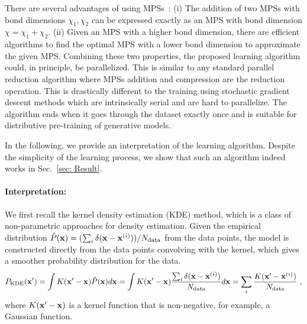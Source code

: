 \documentclass[nonatbib]{article}
\newcommand{\citep}{\cite}
\begin{document}
There are several advantages of using MPSs~\citep{schollwock2011density}:
(i) The addition of two MPSs with bond dimensions $\chi_1, \chi_2$ can be expressed exactly as an MPS with bond dimension $\chi= \chi_1 + \chi_2 $.
(ii) Given an MPS with a higher bond dimension, there are efficient algorithms to find the optimal MPS with a lower bond dimension to approximate the given MPS.
Combining these two properties, the proposed learning algorithm could, in principle, be parallelized.
This is similar to any standard parallel reduction algorithm where MPSs addition and compression are the reduction operation.
This is drastically different to the training using stochastic gradient descent methods which are intrinsically serial and are hard to parallelize.
The algorithm ends when it goes through the dataset exactly once and is suitable for distributive pre-training of generative models.




In the following, we provide an interpretation of the learning algorithm.
Despite the simplicity of the learning process, we show that such an algorithm indeed works in Sec.~\ref{sec: Result}.
    
    
\paragraph{Interpretation:}
We first recall the kernel density estimation (KDE) method, which is a class of non-parametric approaches for density estimation.
Given the empirical distribution $\hat{P}({\bf x}) = ({\sum_{i} \delta({\bf x}- {\bf x}^{(i)}) })/{N_\text{data}}$ from the data points, the model is constructed directly from the data points convolving with the kernel, which gives a smoother probability distribution for the data.
\begin{equation} \label{eq: KDE}
    P_\text{KDE}({\bf x}') = \int K({\bf x}'-{\bf x})\hat{P}({\bf x}) d{\bf x} = \int K({\bf x}'-{\bf x})  \frac{{\sum_{i} \delta({\bf x}- {\bf x}^{(i)}) }}{N_\text{data}} d{\bf x} = \sum_i\frac{K({\bf x}'-{\bf x}^{(i)})}{N_\text{data}} \ ,
\end{equation}
where $K({\bf x}'-{\bf x})$ is a kernel function that is non-negative, for example, a Gaussian function.
\end{document}
